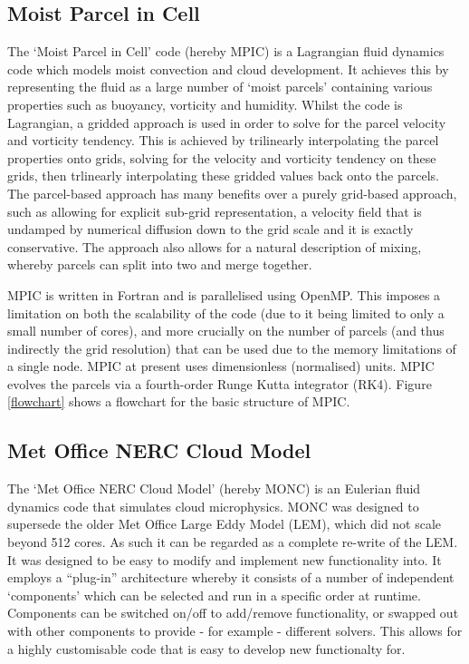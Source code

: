 \documentclass{article}
\begin{document}
\subsection{Moist Parcel in Cell}

The `Moist Parcel in Cell' code (hereby MPIC) is a Lagrangian fluid dynamics code which models moist convection and cloud development. It achieves this by representing the fluid as a large number of `moist parcels' containing various properties such as buoyancy, vorticity and humidity. Whilst the code is Lagrangian, a gridded approach is used in order to solve for the parcel velocity and vorticity tendency. This is achieved by trilinearly interpolating the parcel properties onto grids, solving for the velocity and vorticity tendency on these grids, then trlinearly interpolating these gridded values back onto the parcels. The parcel-based approach has many benefits over a purely grid-based approach, such as allowing for explicit sub-grid representation, a velocity field that is undamped by numerical diffusion down to the grid scale and it is exactly conservative. The approach also allows for a natural description of mixing, whereby parcels can split into two and merge together.

MPIC is written in Fortran and is parallelised using OpenMP. This imposes a limitation on both the scalability of the code (due to it being limited to only a small number of cores), and more crucially on the number of parcels (and thus indirectly the grid resolution) that can be used due to the memory limitations of a single node. MPIC at present uses dimensionless (normalised) units. MPIC evolves the parcels via a fourth-order Runge Kutta integrator (RK4). Figure \ref{flowchart} shows a flowchart for the basic structure of MPIC.


\subsection{Met Office NERC Cloud Model}

The `Met Office NERC Cloud Model' (hereby MONC) is an Eulerian fluid dynamics code that simulates cloud microphysics. MONC was designed to supersede the older Met Office Large Eddy Model (LEM), which did not scale beyond 512 cores. As such it can be regarded as a complete re-write of the LEM. It was designed to be easy to modify and implement new functionality into. It employs a ``plug-in'' architecture whereby it consists of a number of independent `components' which can be selected and run in a specific order at runtime. Components can be switched on/off to add/remove functionality, or swapped out with other components to provide - for example - different solvers. This allows for a highly customisable code that is easy to develop new functionalty for.
\end{document}
